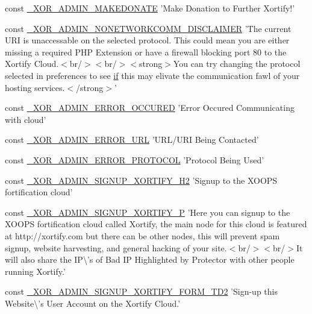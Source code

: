 \begin{DoxyCompactItemize}
\item 
const \hyperlink{admin_8php_af82fe39e33f488420d749c6e47e9b9cd}{\-\_\-\-X\-O\-R\-\_\-\-A\-D\-M\-I\-N\-\_\-\-M\-A\-K\-E\-D\-O\-N\-A\-T\-E} 'Make Donation to Further Xortify!'
\item 
const \hyperlink{admin_8php_a748f2b5592be47602cd0faae99c6c736}{\-\_\-\-X\-O\-R\-\_\-\-A\-D\-M\-I\-N\-\_\-\-N\-O\-N\-E\-T\-W\-O\-R\-K\-C\-O\-M\-M\-\_\-\-D\-I\-S\-C\-L\-A\-I\-M\-E\-R} 'The current U\-R\-I is unaccessable on the selected protocol. This could mean you are either missing a required P\-H\-P Extension or have a firewall blocking port 80 to the Xortify Cloud.$<$br/$>$$<$br/$>$$<$strong$>$You can try changing the protocol selected in preferences to see \hyperlink{poll_2index_8php_ae404acbb304be6b6ac443de921697faf}{if} this may elivate the communication fawl of your hosting services.$<$/strong$>$'
\item 
const \hyperlink{admin_8php_a6f58bf05661814570409cd98573bc0b2}{\-\_\-\-X\-O\-R\-\_\-\-A\-D\-M\-I\-N\-\_\-\-E\-R\-R\-O\-R\-\_\-\-O\-C\-C\-U\-R\-E\-D} 'Error Occured Communicating with cloud'
\item 
const \hyperlink{admin_8php_a99fced20eb19ef6a0024af039f2b8626}{\-\_\-\-X\-O\-R\-\_\-\-A\-D\-M\-I\-N\-\_\-\-E\-R\-R\-O\-R\-\_\-\-U\-R\-L} 'U\-R\-L/U\-R\-I Being Contacted'
\item 
const \hyperlink{admin_8php_a1acbc7d653af2300ac96112c38115d4e}{\-\_\-\-X\-O\-R\-\_\-\-A\-D\-M\-I\-N\-\_\-\-E\-R\-R\-O\-R\-\_\-\-P\-R\-O\-T\-O\-C\-O\-L} 'Protocol Being Used'
\item 
const \hyperlink{admin_8php_a05e9065d35734850f0062843a86364b4}{\-\_\-\-X\-O\-R\-\_\-\-A\-D\-M\-I\-N\-\_\-\-S\-I\-G\-N\-U\-P\-\_\-\-X\-O\-R\-T\-I\-F\-Y\-\_\-\-H2} 'Signup to the X\-O\-O\-P\-S fortification cloud'
\item 
const \hyperlink{admin_8php_a5d647b6b983396b3837a2c6327c0c5d8}{\-\_\-\-X\-O\-R\-\_\-\-A\-D\-M\-I\-N\-\_\-\-S\-I\-G\-N\-U\-P\-\_\-\-X\-O\-R\-T\-I\-F\-Y\-\_\-\-P} 'Here you can signup to the X\-O\-O\-P\-S fortification cloud called Xortify, the main node for this cloud is featured at http\-://xortify.\-com but there can be other nodes, this will prevent spam signup, website harvesting, and general hacking of your site.$<$br/$>$$<$br/$>$It will also share the I\-P\textbackslash{}'s of Bad I\-P Highlighted by Protector with other people running Xortify.'
\item 
const \hyperlink{admin_8php_a3d01c528ec2a398e228faa3a212291e6}{\-\_\-\-X\-O\-R\-\_\-\-A\-D\-M\-I\-N\-\_\-\-S\-I\-G\-N\-U\-P\-\_\-\-X\-O\-R\-T\-I\-F\-Y\-\_\-\-F\-O\-R\-M\-\_\-\-T\-D2} 'Sign-\/up this Website\textbackslash{}'s User Account on the Xortify Cloud.'
$$
\end{DoxyCompactItemize}
